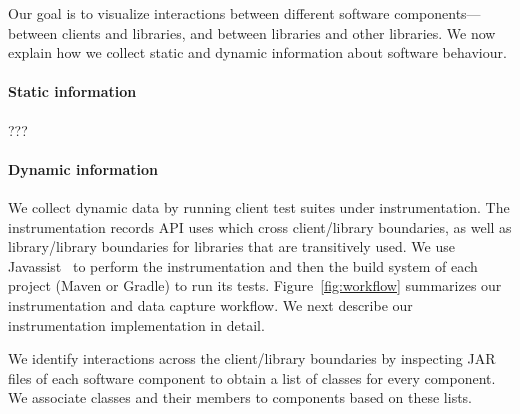 \label{sec:collecting-data}
Our goal is to visualize interactions between different software components---between
clients and libraries, and between libraries and other libraries. We now explain
how we collect static and dynamic information about software behaviour.

\paragraph{Static information} ???

\paragraph{Dynamic information} We collect dynamic data by running client
test suites under instrumentation. 
The instrumentation records API
uses which cross client/library boundaries, as well as library/library boundaries
for libraries that are transitively used. We use
Javassist~\cite{chiba00:_load_struc_reflec_java} to perform the
instrumentation and then the build system of each project (Maven or Gradle) to run its
tests. Figure~\ref{fig:workflow} summarizes our instrumentation and
data capture workflow. We next describe our instrumentation implementation in detail.

We identify interactions across the client/library boundaries by
inspecting JAR files of each software component to obtain a list of
classes for every component. We associate classes and their members to
components based on these lists. 

